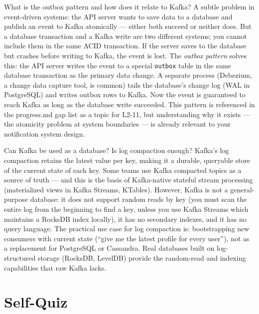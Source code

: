 \documentclass[11pt,a4paper]{article}
\begin{document}
\begin{curiobox}{What is the outbox pattern and how does it relate to Kafka?}
A subtle problem in event-driven systems: the API server wants to save data to a database and publish an event to Kafka atomically --- either both succeed or neither does. But a database transaction and a Kafka write are two different systems; you cannot include them in the same ACID transaction. If the server saves to the database but crashes before writing to Kafka, the event is lost. The \textit{outbox pattern} solves this: the API server writes the event to a special \texttt{outbox} table in the same database transaction as the primary data change. A separate process (Debezium, a change data capture tool, is common) tails the database's change log (WAL in PostgreSQL) and writes outbox rows to Kafka. Now the event is guaranteed to reach Kafka as long as the database write succeeded. This pattern is referenced in the progress.md gap list as a topic for L2-11, but understanding why it exists --- the atomicity problem at system boundaries --- is already relevant to your notification system design.
\end{curiobox}

\begin{curiobox}{Can Kafka be used as a database? Is log compaction enough?}
Kafka's log compaction retains the latest value per key, making it a durable, queryable store of the current state of each key. Some teams use Kafka compacted topics as a source of truth --- and this is the basis of Kafka-native stateful stream processing (materialized views in Kafka Streams, KTables). However, Kafka is not a general-purpose database: it does not support random reads by key (you must scan the entire log from the beginning to find a key, unless you use Kafka Streams which maintains a RocksDB index locally), it has no secondary indexes, and it has no query language. The practical use case for log compaction is: bootstrapping new consumers with current state (``give me the latest profile for every user''), not as a replacement for PostgreSQL or Cassandra. Real databases built on log-structured storage (RocksDB, LevelDB) provide the random-read and indexing capabilities that raw Kafka lacks.
\end{curiobox}

\newpage
\section{Self-Quiz}
\end{document}
